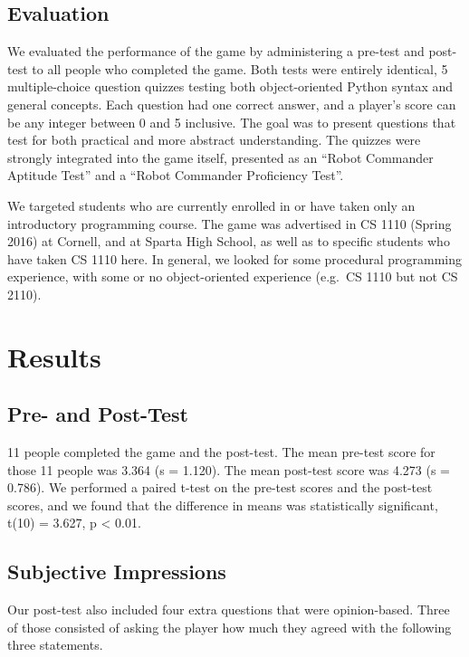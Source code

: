 \documentclass[12pt,notitlepage]{article}
\begin{document}
\subsection{Evaluation}

We evaluated the performance of the game by administering a pre-test
and post-test to all people who completed the game. Both tests were
entirely identical, 5 multiple-choice question quizzes testing both
object-oriented Python syntax and general concepts. Each question had
one correct answer, and a player's score can be any integer between
0 and 5 inclusive. The goal was to present questions that test for both
practical and more abstract understanding. The quizzes were strongly
integrated into the game itself, presented as an
``Robot Commander Aptitude Test'' and a ``Robot Commander Proficiency
Test''.

We targeted students who are currently enrolled in or have taken only
an introductory programming course. The game was advertised in CS 1110
(Spring 2016) at Cornell, and at Sparta High School, as well as
to specific students who have taken CS 1110 here. In general, we
looked for some procedural programming experience, with some or no
object-oriented experience (e.g.\ CS 1110 but not CS 2110).

\section{Results}

\subsection{Pre- and Post-Test}

11 people completed the game and the post-test. The mean pre-test score
for those 11 people was 3.364 (s = 1.120). The mean post-test score was
4.273 (s = 0.786). We performed a paired t-test on the pre-test scores and
the post-test scores, and we found that the difference in means was
statistically significant, t(10) = 3.627, p < 0.01.

\subsection{Subjective Impressions}

Our post-test also included four extra questions that were opinion-based.
Three of those consisted of asking the player how much they agreed with
the following three statements.
\end{document}
